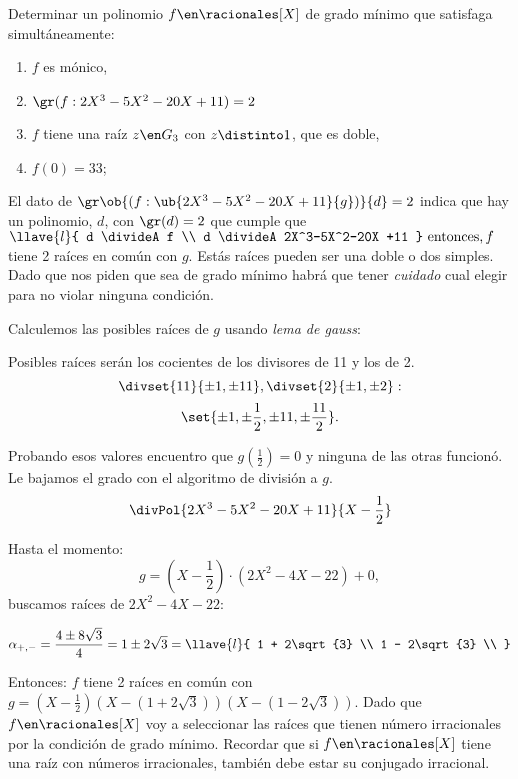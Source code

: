 \begin{enunciado}{\ejExtra}
  Determinar un polinomio $f \en \racionales[X]$ de grado mínimo que satisfaga
  simultáneamente:\par

  \begin{enumerate}[label=$\scriptscriptstyle\blacksquare$]
    \item $f$ es mónico,
    \item $\gr(f:2X^3-5X^2-20X +11) = 2$
    \item $f$ tiene una raíz $z \en G_3$ con $z \distinto 1$, que es doble,
    \item $f(0) = 33$;
  \end{enumerate}
\end{enunciado}

El dato de
$\gr\ob{(f:\ub{2X^3-5X^2-20X +11}{g})}{d} = 2$ indica que hay un polinomio,
$d$, con $\gr(d) = 2$ que cumple que
$
  \llave{l}{
    d \divideA f \\
    d \divideA 2X^3-5X^2-20X +11
  } \text{ entonces,}\, f
$ tiene 2 raíces en común con $g$. Estás raíces pueden ser una doble o dos simples. Dado que nos piden que sea de grado mínimo
habrá que tener \textit{cuidado} cual elegir para no violar ninguna condición.\par

\medskip

Calculemos las posibles raíces de $g$ usando \textit{lema de gauss}:\par
Posibles raíces serán los cocientes de los divisores de 11 y los de 2.
$$
  \divset{11}{\pm1,\pm11}, \divset{2}{\pm1,\pm2}:
$$
$$
  \set{\pm 1,\pm\frac{1}{2},\pm 11, \pm\frac{11}{2}}.
$$

Probando esos valores encuentro que $g(\frac{1}{2}) = 0$ y ninguna de las
otras funcionó. Le bajamos el grado con el algoritmo de división a $g$.
$$
  \divPol{2X^3 - 5X^2 - 20X + 11}{X - \frac{1}{2}}
$$

Hasta el momento:
$$
  g = (X-\frac{1}{2}) \cdot (2X^2 - 4X -22) + 0,
$$
buscamos raíces de $2X^2 - 4X -22$:\par

$$\alpha_{+,-} =
  \frac{4 \pm 8\sqrt{3}}{4} =
  1 \pm 2\sqrt{3} =
  \llave{l}{
    1 + 2\sqrt{3} \\
    1 - 2\sqrt{3} \\
  }
$$

Entonces:
$f$ tiene 2 raíces en común con
$g = (X - \frac{1}{2})(X - (1+2\sqrt{3})) (X - (1-2\sqrt{3})) $. Dado que
$f \en \racionales[X]$  voy a seleccionar las raíces que tienen número irracionales por
la condición de grado mínimo. Recordar que si $f \en \racionales[X]$ tiene una raíz con números irracionales,
también debe estar su conjugado irracional.

